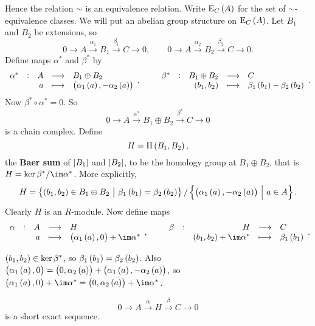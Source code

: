 Hence the relation $ \sim $ is an equivalence relation. Write $ \E_C\br{A} $ for the set of $ \sim $-equivalence classes. We will put an abelian group structure on $ \E_C\br{A} $. Let $ B_1 $ and $ B_2 $ be extensions, so
$$ 0 \to A \xrightarrow{\alpha_1} B_1 \xrightarrow{\beta_1} C \to 0, \qquad 0 \to A \xrightarrow{\alpha_2} B_2 \xrightarrow{\beta_2} C \to 0. $$
Define maps $ \alpha^* $ and $ \beta^* $ by
$$ \function[\alpha^*]{A}{B_1 \oplus B_2}{a}{\br{\alpha_1\br{a}, -\alpha_2\br{a}}}, \qquad \function[\beta^*]{B_1 \oplus B_2}{C}{\br{b_1, b_2}}{\beta_1\br{b_1} - \beta_2\br{b_2}}. $$
Now $ \beta^* \circ \alpha^* = 0 $. So
$$ 0 \to A \xrightarrow{\alpha^*} B_1 \oplus B_2 \xrightarrow{\beta^*} C \to 0 $$
is a chain complex. Define
$$ H = \H\br{B_1, B_2}, $$
the \textbf{Baer sum} of $ \sbr{B_1} $ and $ \sbr{B_2} $, to be the homology group at $ B_1 \oplus B_2 $, that is $ H = \ker \beta^* / \im \alpha^* $. More explicitly,
$$ H = \cbr{\br{b_1, b_2} \in B_1 \oplus B_2 \st \beta_1\br{b_1} = \beta_2\br{b_2}} / \cbr{\br{\alpha_1\br{a}, -\alpha_2\br{a}} \st a \in A}. $$
Clearly $ H $ is an $ R $-module. Now define maps
$$ \function[\alpha]{A}{H}{a}{\br{\alpha_1\br{a}, 0} + \im \alpha^*}, \qquad \function[\beta]{H}{C}{\br{b_1, b_2} + \im \alpha^*}{\beta_1\br{b_1}}. $$


\begin{note*}
$ \br{b_1, b_2} \in \ker \beta^* $, so $ \beta_1\br{b_1} = \beta_2\br{b_2} $. Also $ \br{\alpha_1\br{a}, 0} = \br{0, \alpha_2\br{a}} + \br{\alpha_1\br{a}, -\alpha_2\br{a}} $, so $ \br{\alpha_1\br{a}, 0} + \im \alpha^* = \br{0, \alpha_2\br{a}} + \im \alpha^* $.
\end{note*}

\begin{proposition}
$$ 0 \to A \xrightarrow{\alpha} H \xrightarrow{\beta} C \to 0 $$
is a short exact sequence.
\end{proposition}


